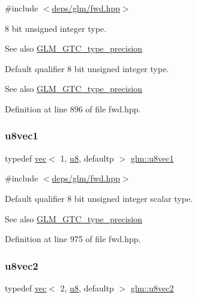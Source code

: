 {\ttfamily \#include $<$\hyperlink{fwd_8hpp}{deps/glm/fwd.\+hpp}$>$}

8 bit unsigned integer type. \begin{DoxySeeAlso}{See also}
\hyperlink{group__gtc__type__precision}{G\+L\+M\+\_\+\+G\+T\+C\+\_\+type\+\_\+precision}
\end{DoxySeeAlso}
Default qualifier 8 bit unsigned integer type. \begin{DoxySeeAlso}{See also}
\hyperlink{group__gtc__type__precision}{G\+L\+M\+\_\+\+G\+T\+C\+\_\+type\+\_\+precision} 
\end{DoxySeeAlso}


Definition at line 896 of file fwd.\+hpp.

\mbox{\label{group__gtc__type__precision_ga5b0875b5979b80a0ccb371bf7f0f95d8}} 
\subsubsection{\texorpdfstring{u8vec1}{u8vec1}}
{\footnotesize\ttfamily typedef \hyperlink{structglm_1_1vec}{vec}$<$ 1, \hyperlink{group__gtc__type__precision_ga5e3dc67373d5068997d2d9f41c9024d2}{u8}, defaultp $>$ \hyperlink{group__gtc__type__precision_ga5b0875b5979b80a0ccb371bf7f0f95d8}{glm\+::u8vec1}}



{\ttfamily \#include $<$\hyperlink{fwd_8hpp}{deps/glm/fwd.\+hpp}$>$}

Default qualifier 8 bit unsigned integer scalar type. \begin{DoxySeeAlso}{See also}
\hyperlink{group__gtc__type__precision}{G\+L\+M\+\_\+\+G\+T\+C\+\_\+type\+\_\+precision} 
\end{DoxySeeAlso}


Definition at line 975 of file fwd.\+hpp.

\mbox{\label{group__gtc__type__precision_ga01e28d0272428f94d22ea6111f0112be}} 
\subsubsection{\texorpdfstring{u8vec2}{u8vec2}}
{\footnotesize\ttfamily typedef \hyperlink{structglm_1_1vec}{vec}$<$ 2, \hyperlink{group__gtc__type__precision_ga5e3dc67373d5068997d2d9f41c9024d2}{u8}, defaultp $>$ \hyperlink{group__gtc__type__precision_ga01e28d0272428f94d22ea6111f0112be}{glm\+::u8vec2}}



